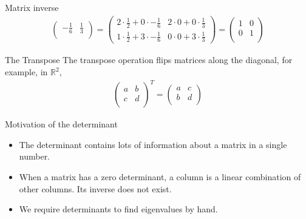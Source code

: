 \documentclass[notes]{beamer}
\begin{document}
\begin{frame}{Matrix inverse}
{\begin{align}
\begin{pmatrix}
          -\frac{1}{6} & \frac{1}{3}\\ 
        \end{pmatrix}
      = 
        \begin{pmatrix}
          2 \cdot \frac{1}{2} + 0 \cdot -\frac{1}{6} & 2 \cdot 0 + 0 \cdot \frac{1}{3}  \\
          1 \cdot \frac{1}{2} + 3 \cdot -\frac{1}{6} & 0 \cdot 0 + 3 \cdot \frac{1}{3} 
        \end{pmatrix}
      =
      \begin{pmatrix}
        1 & 0 \\
        0 & 1 \\ 
      \end{pmatrix}
      \end{align}
      }
    \end{frame}


    \begin{frame}{The Transpose}
      The transpose operation flips matrices along the diagonal, for example, in $\mathbb{R}^2$,
      \begin{align}
        \begin{pmatrix}
          a & b \\
          c & d \\
        \end{pmatrix}^T
        =
        \begin{pmatrix}
          a & c \\
          b & d \\
        \end{pmatrix}
      \end{align}
    \end{frame}

    \begin{frame}{Motivation of the determinant}
      \begin{itemize}
        \item The determinant contains lots of information about a matrix in a single number.
        \item When a matrix has a zero determinant, a column is a linear combination of other
          columns. Its inverse does not exist.
        \item We require determinants to find eigenvalues by hand.
      \end{itemize}
    \end{frame}
\end{document}
